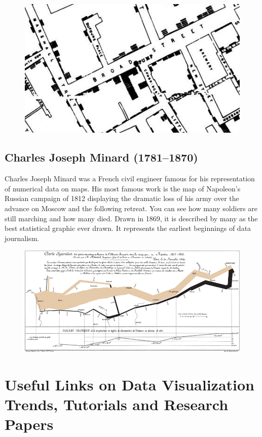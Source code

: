 \documentclass[]{book}
\theoremstyle{definition}
\theoremstyle{definition}
\theoremstyle{definition}
\theoremstyle{remark}
\begin{document}
\begin{figure}
\centering
\includegraphics{images/Snow.png}
\caption{}
\end{figure}

\subsection{Charles Joseph Minard
(1781--1870)}\label{charles-joseph-minard-17811870}

Charles Joseph Minard was a French civil engineer famous for his
representation of numerical data on maps. His most famous work is the
map of Napoleon's Russian campaign of 1812 displaying the dramatic loss
of his army over the advance on Moscow and the following retreat. You
can see how many soldiers are still marching and how many died. Drawn in
1869, it is described by many as the best statistical graphic ever
drawn. It represents the earliest beginnings of data journalism.

\begin{figure}
\centering
\includegraphics{images/Minard.png}
\caption{}
\end{figure}

\section{Useful Links on Data Visualization Trends, Tutorials and
Research
Papers}\label{useful-links-on-data-visualization-trends-tutorials-and-research-papers}
\end{document}
